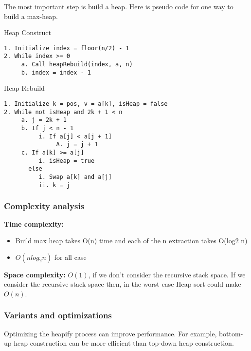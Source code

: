 The most important step is build a heap. Here is pseudo code for one way to build a max-heap. ~\cite{ref1}


\begin{algorithm}
\caption{Heap Construct}
\begin{verbatim}
1. Initialize index = floor(n/2) - 1
2. While index >= 0
     a. Call heapRebuild(index, a, n)
     b. index = index - 1
\end{verbatim}
\end{algorithm}

\begin{algorithm}
\caption{Heap Rebuild}
\begin{verbatim}
1. Initialize k = pos, v = a[k], isHeap = false
2. While not isHeap and 2k + 1 < n
     a. j = 2k + 1
     b. If j < n - 1
          i. If a[j] < a[j + 1]
               A. j = j + 1
     c. If a[k] >= a[j]
          i. isHeap = true
       else
          i. Swap a[k] and a[j]
          ii. k = j
\end{verbatim}
\end{algorithm}

\subsubsection{Complexity analysis}

\textbf{Time complexity:}
\begin{itemize}[label=-]
    \item Build max heap takes O(n) time and each of the n extraction takes O(log2 n)
    \item $O(n log_2 n)$ for all case
\end{itemize}

\textbf{Space complexity:} $O(1)$, if we don’t consider the recursive stack space. If we consider the recursive stack space then, in the worst case Heap sort could make $O(n)$.

\subsubsection{Variants and optimizations} 
Optimizing the heapify process can improve performance. For example, bottom-up heap construction can be more efficient than top-down heap construction.

\vspace{10pt}